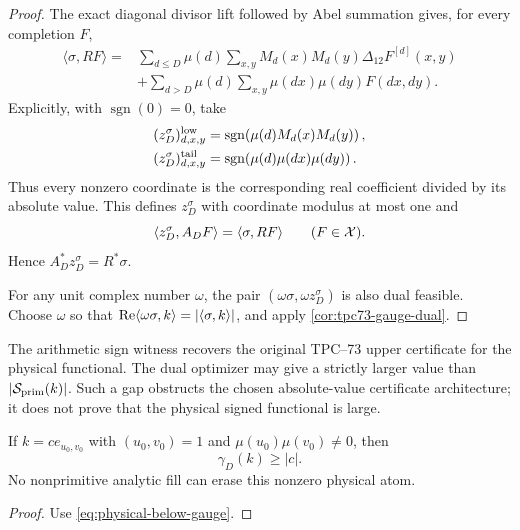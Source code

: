 \begin{proof}
The exact diagonal divisor lift followed by Abel summation
\citep{WangTPC71} gives, for every completion \(F\),
\begin{align*}
 \langle\sigma,RF\rangle
 ={}&
 \sum_{d\le D}\mu(d)
 \sum_{x,y}M_d(x)M_d(y)
 \Delta_{12}F^{[d]}(x,y)\\
 &+
 \sum_{d>D}\mu(d)
 \sum_{x,y}\mu(dx)\mu(dy)F(dx,dy).
\end{align*}
Explicitly, with \(\operatorname{sgn}(0)=0\), take
\begin{align*}
 (z^\sigma_D)^{\rm low}_{d,x,y}
 &=
 \operatorname{sgn}\!\left(
 \mu(d)M_d(x)M_d(y)
 \right),\\
 (z^\sigma_D)^{\rm tail}_{d,x,y}
 &=
 \operatorname{sgn}\!\left(
 \mu(d)\mu(dx)\mu(dy)
 \right).
\end{align*}
Thus every nonzero coordinate is the corresponding real coefficient
divided by its absolute value.  This defines \(z^\sigma_D\) with coordinate
modulus at most one and
\[
 \langle z^\sigma_D,A_DF\rangle
 =
 \langle\sigma,RF\rangle
 \qquad(F\in\mathcal X).
\]
Hence \(A_D^*z^\sigma_D=R^*\sigma\).

For any unit complex number \(\omega\), the pair
\((\omega\sigma,\omega z^\sigma_D)\) is also dual feasible.  Choose
\(\omega\) so that
\(\operatorname{Re}\langle\omega\sigma,k\rangle
=|\langle\sigma,k\rangle|\), and apply
\cref{cor:tpc73-gauge-dual}.
\end{proof}

\begin{remark}
The arithmetic sign witness recovers the original TPC--73 upper
certificate for the physical functional.  The dual optimizer may give a
strictly larger value than
\(|\mathcal S_{\rm prim}(k)|\).  Such a gap obstructs the chosen
absolute-value certificate architecture; it does not prove that the
physical signed functional is large.
\end{remark}

\begin{corollary}
\label{cor:single-atom-rigidity}
If \(k=ce_{u_0,v_0}\) with
\((u_0,v_0)=1\) and \(\mu(u_0)\mu(v_0)\ne0\), then
\[
 \gamma_D(k)\ge|c|.
\]
No nonprimitive analytic fill can erase this nonzero physical atom.
\end{corollary}

\begin{proof}
Use \cref{eq:physical-below-gauge}.
\end{proof}
